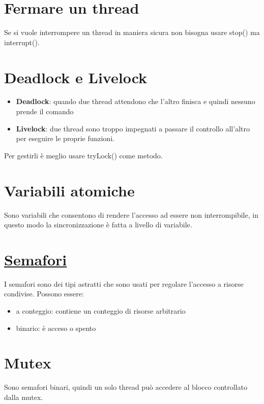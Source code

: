 \documentclass[11pt,a4paper]{book}
\begin{document}
\section{Fermare un thread}
Se si vuole interrompere un thread in maniera sicura non bisogna usare stop() ma interrupt().
\section{Deadlock e Livelock}
\begin{itemize}
	\item \textbf{Deadlock}: quando due thread attendono che l'altro finisca e quindi nessuno prende il comando
	\item \textbf{Livelock}: due thread sono troppo impegnati a passare il controllo all'altro per eseguire le proprie funzioni.
\end{itemize}

Per gestirli è meglio usare tryLock() come metodo.
\section{Variabili atomiche}
Sono variabili che consentono di rendere l'accesso ad essere non interrompibile, in questo modo la sincronizzazione è fatta a livello di variabile.
\section{\href{https://docs.oracle.com/javase/7/docs/api/java/util/concurrent/Semaphore.html}{Semafori}}
I semafori sono dei tipi astratti che sono usati per regolare l'accesso a risorse condivise. Possono essere:
\begin{itemize}
	\item a conteggio: contiene un conteggio di risorse arbitrario
	\item binario: è acceso o spento
\end{itemize}

\section{Mutex}
Sono semafori binari, quindi un solo thread può accedere al blocco controllato dalla mutex.
\end{document}
